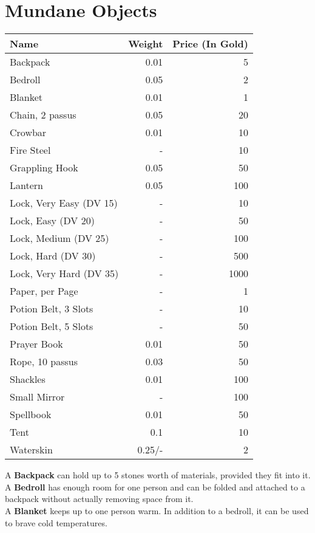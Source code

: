 \section{Mundane Objects}
\begin{longtable}{l | r | r}
	Name & Weight & Price (In Gold)\\ \hline
	Backpack & 0.01 & 5\\
	Bedroll & 0.05 & 2\\
	Blanket & 0.01 & 1\\
	Chain, 2 passus & 0.05 & 20\\
	Crowbar & 0.01 & 10\\
	Fire Steel & - & 10\\
	Grappling Hook & 0.05 & 50\\
	Lantern & 0.05 & 100\\
	Lock, Very Easy (DV 15) & - & 10\\
	Lock, Easy (DV 20) & - & 50\\
	Lock, Medium (DV 25) & - & 100\\
	Lock, Hard (DV 30) & - & 500\\
	Lock, Very Hard (DV 35) & - & 1000\\
	Paper, per Page & - & 1\\
	Potion Belt, 3 Slots & - & 10\\
	Potion Belt, 5 Slots & - & 50\\
	Prayer Book & 0.01 & 50\\
	Rope, 10 passus & 0.03 & 50\\
	Shackles & 0.01 & 100\\
	Small Mirror & - & 100\\
	Spellbook & 0.01 & 50\\
	Tent & 0.1 & 10\\
	Waterskin & 0.25/- & 2\\
\end{longtable}



A \textbf{Backpack} can hold up to 5 stones worth of materials, provided they fit into it.\\

A \textbf{Bedroll} has enough room for one person and can be folded and attached to a backpack without actually removing space from it.\\

A \textbf{Blanket} keeps up to one person warm. In addition to a bedroll, it can be used to brave cold temperatures.\\

